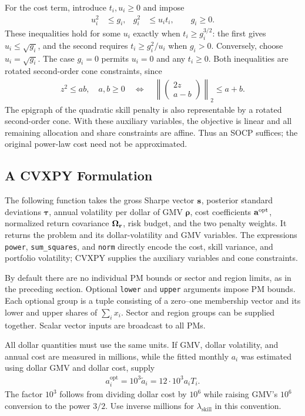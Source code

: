 \documentclass[11pt]{gappyarticle}
\begin{document}
For the cost term, introduce $t_i,u_i\geq0$ and impose
\begin{align}
    u_i^2&\leq g_i,&
    g_i^2&\leq u_i t_i,\qquad g_i\geq0.
\end{align}
These inequalities hold for some $u_i$ exactly when
$t_i\geq g_i^{3/2}$: the first gives $u_i\leq\sqrt{g_i}$, and the
second requires $t_i\geq g_i^2/u_i$ when $g_i>0$. Conversely, choose
$u_i=\sqrt{g_i}$. The case $g_i=0$ permits $u_i=0$ and any $t_i\geq0$.
Both inequalities are rotated second-order cone constraints, since
\begin{align}
    z^2\leq ab,\quad a,b\geq0
    \quad\Longleftrightarrow\quad
    \left\|\begin{pmatrix}2z\\a-b\end{pmatrix}\right\|_2\leq a+b.
\end{align}
The epigraph of the quadratic skill penalty is also representable by a
rotated second-order cone. With these auxiliary variables, the objective
is linear and all remaining allocation and share constraints are affine.
Thus an SOCP suffices; the original power-law cost need not be approximated.

\subsection{A CVXPY Formulation}
The following function takes the gross Sharpe vector ${\mathbf{s}}$, posterior
standard deviations $\boldsymbol\tau$, annual volatility per dollar of
GMV $\boldsymbol\rho$, cost coefficients ${\mathbf{a}}^{\mathrm{opt}}$, normalized
return covariance ${\boldsymbol{\Omega}}_{\mathbf{r}}$, risk budget, and the two penalty weights.
It returns the problem and its dollar-volatility and GMV variables.
The expressions \texttt{power}, \texttt{sum\_squares}, and \texttt{norm}
directly encode the cost, skill variance, and portfolio volatility;
CVXPY supplies the auxiliary variables and cone constraints.

By default there are no individual PM bounds or sector and region limits,
as in the preceding section. Optional \texttt{lower} and \texttt{upper}
arguments impose PM bounds. Each optional group is a tuple consisting of
a zero--one membership vector and its lower and upper shares of
$\sum_i x_i$. Sector and region groups can be supplied together.
Scalar vector inputs are broadcast to all PMs.

All dollar quantities must use the same units. If GMV, dollar volatility,
and annual cost are measured in millions, while the fitted monthly $a_i$
was estimated using dollar GMV and dollar cost, supply
\begin{align}
    a_i^{\mathrm{opt}}=10^3\tilde a_i
                       =12\cdot10^3 a_iT_i.
\end{align}
The factor $10^3$ follows from dividing dollar cost by $10^6$ while
raising GMV's $10^6$ conversion to the power $3/2$.
Use inverse millions for $\lambda_{\mathrm{skill}}$ in this convention.
\end{document}
